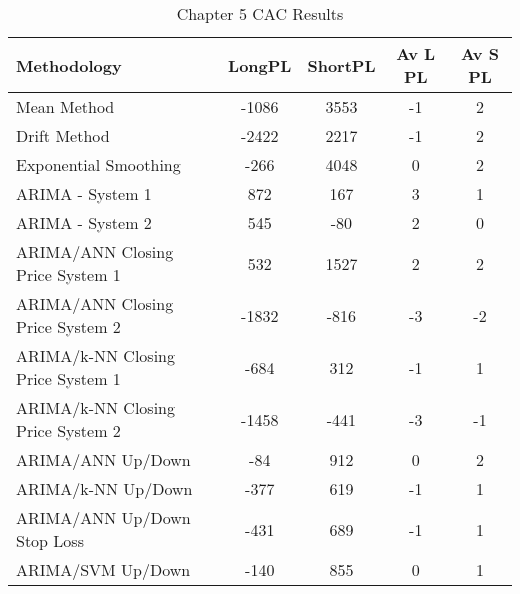 \begin{table}[ht]
\centering
\caption[Chapter 5 CAC Results]{Chapter 5 CAC Results} 
\label{tab:chp6:cac2_summary}
\begin{tabular}{lcccc}
  \toprule Methodology & LongPL & ShortPL & Av L PL & Av S PL \\ 
  \midrule Mean Method & -1086 & 3553 & -1 & 2 \\ 
  Drift Method & -2422 & 2217 & -1 & 2 \\ 
  Exponential Smoothing & -266 & 4048 & 0 & 2 \\ 
  ARIMA - System 1 & 872 & 167 & 3 & 1 \\ 
  ARIMA - System 2 & 545 & -80 & 2 & 0 \\ 
  ARIMA/ANN Closing Price System 1 & 532 & 1527 & 2 & 2 \\ 
  ARIMA/ANN Closing Price System 2 & -1832 & -816 & -3 & -2 \\ 
  ARIMA/k-NN Closing Price System 1 & -684 & 312 & -1 & 1 \\ 
  ARIMA/k-NN Closing Price System 2 & -1458 & -441 & -3 & -1 \\ 
  ARIMA/ANN Up/Down & -84 & 912 & 0 & 2 \\ 
  ARIMA/k-NN Up/Down & -377 & 619 & -1 & 1 \\ 
  ARIMA/ANN Up/Down Stop Loss & -431 & 689 & -1 & 1 \\ 
  ARIMA/SVM Up/Down & -140 & 855 & 0 & 1 \\ 
   \bottomrule \end{tabular}
\end{table}
